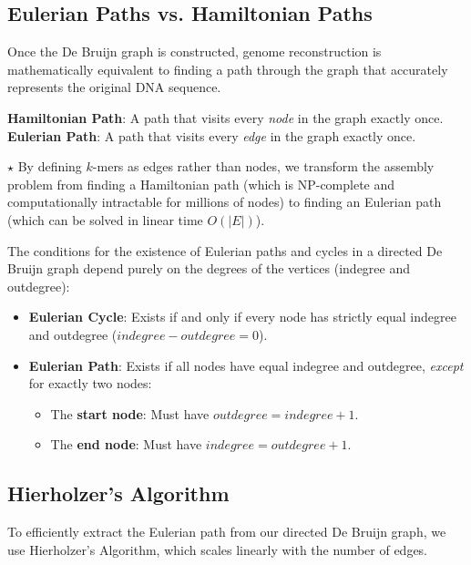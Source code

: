 \documentclass[11pt, a4paper]{article}
\newenvironment{important}{%
    \begin{tcolorbox}[colback=blue!5!white,colframe=blue!75!black,title=Important Concept]
}{%
    \end{tcolorbox}
}
\newcommand{\sta}{\textbf{\color{red}$\star$ }}
\begin{document}
\subsection{Eulerian Paths vs. Hamiltonian Paths}
Once the De Bruijn graph is constructed, genome reconstruction is mathematically equivalent to finding a path through the graph that accurately represents the original DNA sequence.

\begin{important}
    \textbf{Hamiltonian Path}: A path that visits every \textit{node} in the graph exactly once. \\
    \textbf{Eulerian Path}: A path that visits every \textit{edge} in the graph exactly once.
\end{important}

\sta By defining $k$-mers as edges rather than nodes, we transform the assembly problem from finding a Hamiltonian path (which is NP-complete and computationally intractable for millions of nodes) to finding an Eulerian path (which can be solved in linear time $O(|E|)$).

The conditions for the existence of Eulerian paths and cycles in a directed De Bruijn graph depend purely on the degrees of the vertices (indegree and outdegree):
\begin{itemize}
    \item \textbf{Eulerian Cycle}: Exists if and only if every node has strictly equal indegree and outdegree ($indegree - outdegree = 0$).
    \item \textbf{Eulerian Path}: Exists if all nodes have equal indegree and outdegree, \textit{except} for exactly two nodes:
    \begin{itemize}
        \item The \textbf{start node}: Must have $outdegree = indegree + 1$.
        \item The \textbf{end node}: Must have $indegree = outdegree + 1$.
    \end{itemize}
\end{itemize}

\subsection{Hierholzer's Algorithm}
To efficiently extract the Eulerian path from our directed De Bruijn graph, we use Hierholzer's Algorithm, which scales linearly with the number of edges.
\end{document}
